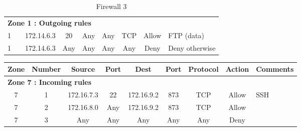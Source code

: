\documentclass[a4paper,titlepage]{article}
\begin{document}
\begin{landscape}
\begin{table}[h]
\begin{tabular}{c|c|cc|cc|ccl}
			\hline
			\multicolumn{9}{l}{\textbf{Zone 1 : Outgoing rules}}\\
			1 &  & 172.14.6.3 & 20 & Any & Any & TCP & Allow & FTP (data)\\
			1 &  & 172.14.6.3 & Any & Any & Any & Any & Deny & Deny otherwise\\
		\end{tabular}
		\caption{Firewall 3}
	\end{table}
	\vspace*{\fill}
\end{landscape}




\begin{landscape}
	\vspace*{\fill}
	\begin{table}[h]
		\center
		\begin{tabular}{c|c|cc|cc|ccl}
			Zone & Number & Source & Port & Dest & Port & Protocol & Action & \multicolumn{1}{c}{Comments}\\
			\hline
			\multicolumn{9}{l}{\textbf{Zone 7 : Incoming rules}}\\
			7 & 1 & 172.16.7.3 & 22 & 172.16.9.2 & 873 & TCP & Allow & SSH\\
			7 & 2 & 172.16.8.0 & Any & 172.16.9.2 & 873 & TCP & Allow & \\
			7 & 3 & Any & Any & Any & Any & Any & Deny & \\


\end{tabular}
\end{table}
\end{landscape}
\end{document}
